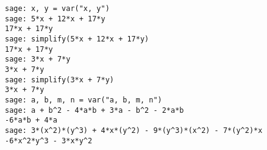 \begin{lstlisting}
sage: x, y = var("x, y")
sage: 5*x + 12*x + 17*y
17*x + 17*y
sage: simplify(5*x + 12*x + 17*y)
17*x + 17*y
sage: 3*x + 7*y
3*x + 7*y
sage: simplify(3*x + 7*y)
3*x + 7*y
sage: a, b, m, n = var("a, b, m, n")
sage: a + b^2 - 4*a*b + 3*a - b^2 - 2*a*b
-6*a*b + 4*a
sage: 3*(x^2)*(y^3) + 4*x*(y^2) - 9*(y^3)*(x^2) - 7*(y^2)*x
-6*x^2*y^3 - 3*x*y^2
\end{lstlisting}
